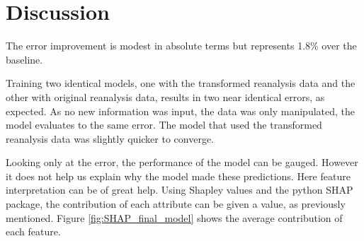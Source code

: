 \section{Discussion}
The error improvement is modest in absolute terms but represents 1.8\% over the baseline. 

Training two identical models, one with the transformed reanalysis data and the other with original reanalysis data, results in two near identical errors, as expected. As no new information was input, the data was only manipulated, the model evaluates to the same error. The model that used the transformed reanalysis data was slightly quicker to converge.

Looking only at the error, the performance of the model can be gauged. However it does not help us explain why the model made these predictions. Here feature interpretation can be of great help. Using Shapley values and the python SHAP package, the contribution of each attribute can be given a value, as previously mentioned. Figure \ref{fig:SHAP_final_model} shows the average contribution of each feature.